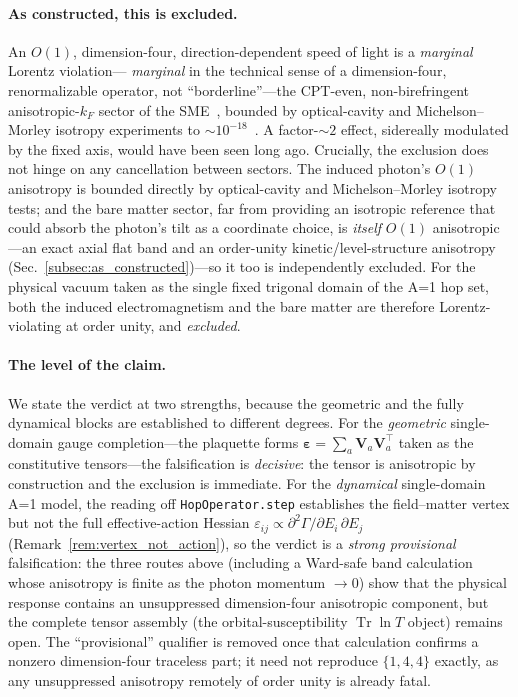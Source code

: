 \paragraph{As constructed, this is excluded.} An $O(1)$, dimension-four,
direction-dependent speed of light is a \emph{marginal} Lorentz violation---%
\emph{marginal} in the technical sense of a dimension-four, renormalizable operator, not
``borderline''---the CPT-even, non-birefringent anisotropic-$k_F$ sector of the
SME~\cite{kosteleckymewes2009,kosteleckyrussell2011}, bounded by optical-cavity and
Michelson--Morley isotropy experiments to $\sim\!10^{-18}$~\cite{nagel2015}. A factor-$\sim2$ effect,
sidereally modulated by the fixed axis, would have been seen long ago. Crucially, the
exclusion does not hinge on any cancellation between sectors. The induced photon's $O(1)$
anisotropy is bounded directly by optical-cavity and Michelson--Morley isotropy tests; and
the bare matter sector, far from providing an isotropic reference that could absorb the
photon's tilt as a coordinate choice, is \emph{itself} $O(1)$ anisotropic---an exact axial
flat band and an order-unity kinetic/level-structure anisotropy
(Sec.~\ref{subsec:as_constructed})---so it too is independently excluded. For the physical
vacuum taken as the single fixed trigonal domain of the A=1 hop set, both the induced
electromagnetism and the bare matter are therefore Lorentz-violating at order unity, and
\emph{excluded}.

\paragraph{The level of the claim.} We state the verdict at two strengths, because the
geometric and the fully dynamical blocks are established to different degrees. For the
\emph{geometric} single-domain gauge completion---the plaquette forms
$\boldsymbol{\varepsilon}=\sum_a\mathbf{V}_a\mathbf{V}_a^{\!\top}$ taken as the
constitutive tensors---the falsification is \emph{decisive}: the tensor is anisotropic by
construction and the exclusion is immediate. For the \emph{dynamical} single-domain A=1
model, the reading off \texttt{HopOperator.step} establishes the field--matter vertex but
not the full effective-action Hessian
$\varepsilon_{ij}\propto\partial^2\Gamma/\partial E_i\,\partial E_j$
(Remark~\ref{rem:vertex_not_action}), so the verdict is a \emph{strong provisional}
falsification: the three routes above (including a Ward-safe band calculation whose
anisotropy is finite as the photon momentum $\to0$) show that the physical response
contains an unsuppressed dimension-four anisotropic component, but the complete tensor
assembly (the orbital-susceptibility $\operatorname{Tr}\ln T$ object) remains open. The
``provisional'' qualifier is removed once that calculation confirms a nonzero
dimension-four traceless part; it need not reproduce $\{1,4,4\}$ exactly, as any
unsuppressed anisotropy remotely of order unity is already fatal.

